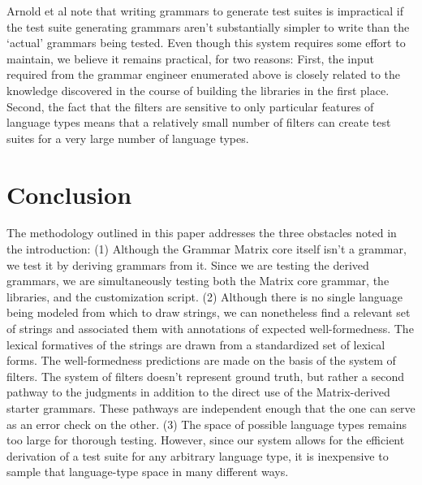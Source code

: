\documentclass[11pt]{article}
\begin{document}
Arnold et al  note that writing grammars to
generate test suites is impractical if the test suite generating
grammars aren't substantially simpler to write than the `actual'
grammars being tested.  Even though this system requires some effort
to maintain, we believe it remains practical, for two reasons: First,
the input required from the grammar engineer enumerated above is
closely related to the knowledge discovered in the course of building
the libraries in the first place.  Second, the fact that the filters
are sensitive to only particular features of language types means that
a relatively small number of filters can create test suites for a very
large number of language types.

\section{Conclusion}

The methodology outlined in this paper addresses the three obstacles
noted in the introduction: (1) Although the Grammar Matrix core
itself isn't a grammar, we test it by deriving grammars from it. Since we
are testing the derived grammars, we are simultaneously testing both
the Matrix core grammar, the libraries, and the customization script.
(2) Although there is no single language being modeled from which to
draw strings, we can nonetheless find a relevant set of strings and
associated them with annotations of expected well-formedness.  The
lexical formatives of the strings are drawn from a standardized set
of lexical forms.  The well-formedness predictions are made on the basis
of the system of filters.  The system of filters doesn't represent
ground truth, but rather a second pathway to the judgments in 
addition to the direct use of the Matrix-derived starter grammars.
These pathways are independent enough that the one can serve as an
error check on the other. (3) The space of possible language types
remains too large for thorough testing.  However, since our system allows
for the efficient derivation of a test suite for any arbitrary
language type, it is inexpensive to sample that language-type space in
many different ways.










\end{document}
